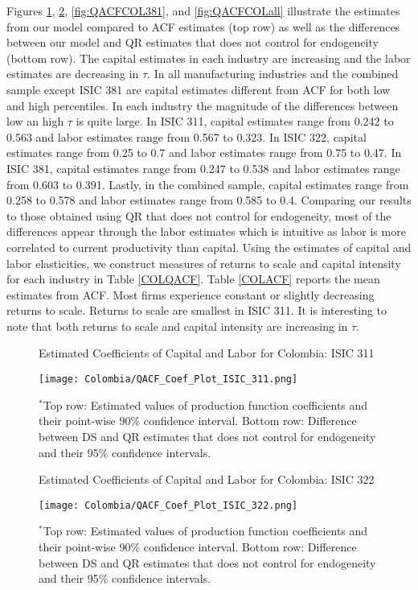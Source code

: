 \documentclass[12pt]{article}
\begin{document}
Figures \ref{fig:QACFCOL311}, \ref{fig:QACFCOL321}, \ref{fig:QACFCOL381}, and \ref{fig:QACFCOLall}  illustrate the estimates from our model compared to ACF estimates (top row) as well as the differences between our model and QR estimates that does not control for endogeneity (bottom row). The capital estimates in each industry are increasing and the labor estimates are decreasing in $\tau$. In all manufacturing industries and the combined sample except ISIC 381 are capital estimates different from ACF for both low and high percentiles. In each industry the magnitude of the differences between low an high $\tau$ is quite large. In ISIC 311, capital estimates range from 0.242 to 0.563 and labor estimates range from 0.567 to 0.323. In ISIC 322, capital estimates range from 0.25 to 0.7 and labor estimates range from 0.75 to 0.47. In ISIC 381, capital estimates range from 0.247 to 0.538 and labor estimates range from 0.603 to 0.391. Lastly, in the combined sample, capital estimates range from 0.258 to 0.578 and labor estimates range from 0.585 to 0.4. Comparing our results to those obtained using QR that does not control for endogeneity, most of the differences appear through the labor estimates which is intuitive as labor is more correlated to current productivity than capital. Using the estimates of capital and labor elasticities, we construct measures of returns to scale and capital intensity for each industry in Table \ref{COLQACF}. Table \ref{COLACF} reports the mean estimates from ACF. Most firms experience constant or slightly decreasing returns to scale. Returns to scale are smallest in ISIC 311. It is interesting to note that both returns to scale and capital intensity are increasing in $\tau$.

\begin{figure}[H]
\centering
\caption{Estimated Coefficients of Capital and Labor for Colombia: ISIC 311}
\texttt{[image: Colombia/QACF\_Coef\_Plot\_ISIC\_311.png]}
\caption*{\footnotesize $^{*}$Top row: Estimated values of production function coefficients and their point-wise 90\% confidence interval. Bottom row: Difference between DS and QR estimates that does not control for endogeneity and their 95\% confidence intervals.}
\label{fig:QACFCOL311}
\end{figure}

\begin{figure}[H]
\centering
\caption{Estimated Coefficients of Capital and Labor for Colombia: ISIC 322}
\texttt{[image: Colombia/QACF\_Coef\_Plot\_ISIC\_322.png]}
\caption*{\footnotesize $^{*}$Top row: Estimated values of production function coefficients and their point-wise 90\% confidence interval. Bottom row: Difference between DS and QR estimates that does not control for endogeneity and their 95\% confidence intervals.}
\label{fig:QACFCOL321}
\end{figure}
\end{document}
